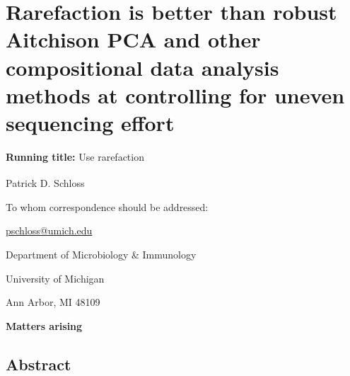 \documentclass[
  11pt,
]{article}
\author{}
\date{}
\begin{document}
\raggedright

\section{Rarefaction is better than robust Aitchison PCA and other
compositional data analysis methods at controlling for uneven sequencing
effort}\label{rarefaction-is-better-than-robust-aitchison-pca-and-other-compositional-data-analysis-methods-at-controlling-for-uneven-sequencing-effort}

\vspace{20mm}

\textbf{Running title:} Use rarefaction

\vspace{20mm}

Patrick D. Schloss \textsuperscript{\textdagger}

\vspace{40mm}

\textdagger To whom correspondence should be addressed:

\href{mailto:pschloss@umich.edu}{pschloss@umich.edu}

Department of Microbiology \& Immunology

University of Michigan

Ann Arbor, MI 48109

\vspace{20mm}

\textbf{Matters arising}

\newpage{}

\subsection{Abstract}\label{abstract}
\end{document}
